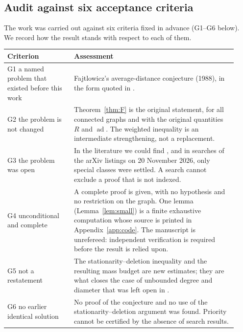 \documentclass[11pt,a4paper]{article}
\theoremstyle{definition}
\theoremstyle{remark}
\numberwithin{equation}{section}
\newcommand{\ad}{\operatorname{ad}}
\begin{document}
\subsection{Audit against six acceptance criteria}\label{sec:audit}
The work was carried out against six criteria fixed in advance (G1--G6 below). We
record how the result stands with respect to each of them.
\begin{center}\small
\begin{tabular}{p{0.27\linewidth}p{0.66\linewidth}}
\toprule
Criterion & Assessment\\
\midrule
G1 a named problem that existed before this work & Fajtlowicz's average-distance conjecture \cite{Faj} (1988), in the form quoted in \cite{CPS,YL,LiShi}.\\
G2 the problem is not changed & Theorem~\ref{thm:F} is the original statement, for all connected graphs and with the original quantities $R$ and $\ad$. The weighted inequality is an intermediate strengthening, not a replacement.\\
G3 the problem was open & In the literature we could find \cite{CPS,YL,LiShi,Dalfo,VMRC189}, and in searches of the arXiv listings on 20 November 2026, only special classes were settled. A search cannot exclude a proof that is not indexed.\\
G4 unconditional and complete & A complete proof is given, with no hypothesis and no restriction on the graph. One lemma (Lemma~\ref{lem:small}) is a finite exhaustive computation whose source is printed in Appendix~\ref{app:code}. The manuscript is unrefereed: independent verification is required before the result is relied upon.\\
G5 not a restatement & The stationarity--deletion inequality and the resulting mass budget are new estimates; they are what closes the case of unbounded degree and diameter that was left open in \cite{VMRC189}.\\
G6 no earlier identical solution & No proof of the conjecture and no use of the stationarity--deletion argument was found. Priority cannot be certified by the absence of search results.\\
\bottomrule
\end{tabular}
\end{center}
\end{document}
